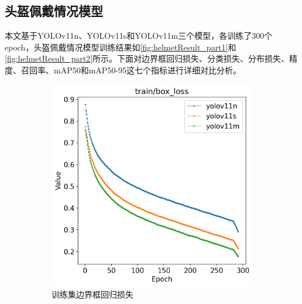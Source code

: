 \subsection{头盔佩戴情况模型}
本文基于YOLOv11n、YOLOv11s和YOLOv11m三个模型，各训练了300个epoch，头盔佩戴情况模型训练结果如\ref{fig:helmetResult_part1}和\ref{fig:helmetResult_part2}所示。下面对边界框回归损失、分类损失、分布损失、精度、召回率、mAP50和mAP50-95这七个指标进行详细对比分析。
\begin{figure}[H]
    \centering
    \begin{subfigure}[t]{0.43\textwidth}
        \centering
        \includegraphics[width=\textwidth]{figs/chap04/helmet_result/helmet_train_box_loss.png}
        \caption{训练集边界框回归损失}
        \label{fig:helmet_train_box_loss}
    \end{subfigure}
    \begin{subfigure}[t]{0.43\textwidth}
        \centering

\end{subfigure}
\end{figure}
